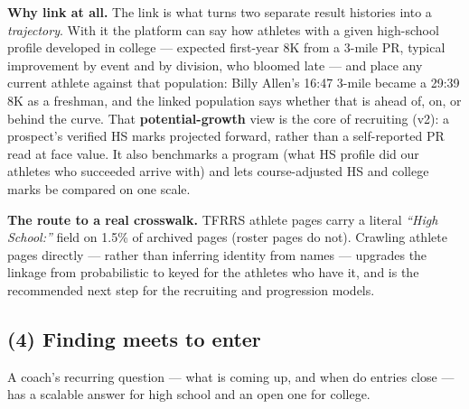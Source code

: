 \medskip
\noindent\textbf{Why link at all.} The link is what turns two separate
result histories into a \emph{trajectory}. With it the platform can say how
athletes with a given high-school profile developed in college --- expected
first-year 8K from a 3-mile PR, typical improvement by event and by
division, who bloomed late --- and place any current athlete against that
population: Billy Allen's 16:47 3-mile became a 29:39 8K as a freshman, and
the linked population says whether that is ahead of, on, or behind the
curve. That \textbf{potential-growth} view is the core of recruiting (v2):
a prospect's verified HS marks projected forward, rather than a self-reported
PR read at face value. It also benchmarks a program (what HS profile did our
athletes who succeeded arrive with) and lets course-adjusted HS and college
marks be compared on one scale.

\noindent\textbf{The route to a real crosswalk.} TFRRS athlete pages carry a
literal \emph{``High School:''} field on 1.5\% of archived pages (roster pages do
not). Crawling athlete pages directly --- rather than inferring identity from
names --- upgrades the linkage from probabilistic to keyed for the athletes who
have it, and is the recommended next step for the recruiting and progression
models.

\subsection{(4) Finding meets to enter}

A coach's recurring question --- what is coming up, and when do entries
close --- has a scalable answer for high school and an open one for college.

